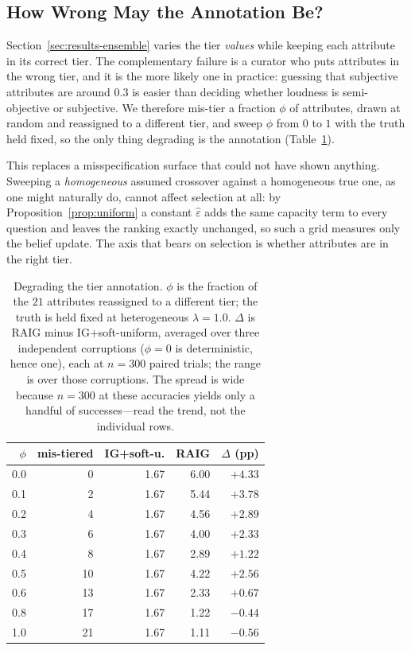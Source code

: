 \subsection{How Wrong May the Annotation Be?}
\label{sec:results-corruption}

Section~\ref{sec:results-ensemble} varies the tier \emph{values} while keeping
each attribute in its correct tier. The complementary failure is a curator who
puts attributes in the wrong tier, and it is the more likely one in practice:
guessing that subjective attributes are around $0.3$ is easier than deciding
whether loudness is semi-objective or subjective. We therefore mis-tier a
fraction $\phi$ of attributes, drawn at random and reassigned to a different
tier, and sweep $\phi$ from $0$ to $1$ with the truth held fixed, so the only
thing degrading is the annotation (Table~\ref{tab:corruption}).

This replaces a misspecification surface that could not have shown anything.
Sweeping a \emph{homogeneous} assumed crossover against a homogeneous true one,
as one might naturally do, cannot affect selection at all: by
Proposition~\ref{prop:uniform} a constant $\hat\varepsilon$ adds the same
capacity term to every question and leaves the ranking exactly unchanged, so
such a grid measures only the belief update. The axis that bears on selection
is whether attributes are in the right tier.

\begin{table}[t]
\caption{Degrading the tier annotation. $\phi$ is the fraction of the $21$
attributes reassigned to a different tier; the truth is held fixed at
heterogeneous $\lambda = 1.0$. $\Delta$ is RAIG minus IG+soft-uniform, averaged
over three independent corruptions ($\phi = 0$ is deterministic, hence one),
each at $n = 300$ paired trials; the range is over those corruptions. The
spread is wide because $n = 300$ at these accuracies yields only a handful of
successes---read the trend, not the individual rows.}
\label{tab:corruption}
\centering
\footnotesize
\begin{tabular}{@{}rrrrr@{}}
\toprule
$\phi$ & \textbf{mis-tiered} & \textbf{IG+soft-u.} & \textbf{RAIG} &
\textbf{$\Delta$ (pp)} \\
\midrule
0.0 & 0  & 1.67 & 6.00 & $+4.33$ \\
0.1 & 2  & 1.67 & 5.44 & $+3.78$ \\
0.2 & 4  & 1.67 & 4.56 & $+2.89$ \\
0.3 & 6  & 1.67 & 4.00 & $+2.33$ \\
0.4 & 8  & 1.67 & 2.89 & $+1.22$ \\
0.5 & 10 & 1.67 & 4.22 & $+2.56$ \\
0.6 & 13 & 1.67 & 2.33 & $+0.67$ \\
0.8 & 17 & 1.67 & 1.22 & $-0.44$ \\
1.0 & 21 & 1.67 & 1.11 & $-0.56$ \\
\bottomrule
\end{tabular}
\end{table}

